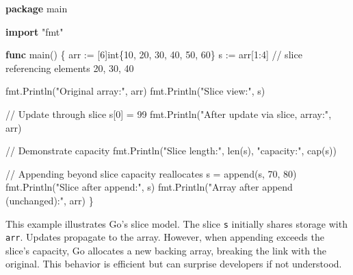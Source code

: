 \documentclass[
  letterpaper,
  DIV=11,
  numbers=noendperiod]{scrreprt}
\newenvironment{Shaded}{\begin{snugshade}}{\end{snugshade}}
\newcommand{\BuiltInTok}[1]{\textcolor[rgb]{0.00,0.23,0.31}{#1}}
\newcommand{\CommentTok}[1]{\textcolor[rgb]{0.37,0.37,0.37}{#1}}
\newcommand{\DataTypeTok}[1]{\textcolor[rgb]{0.68,0.00,0.00}{#1}}
\newcommand{\DecValTok}[1]{\textcolor[rgb]{0.68,0.00,0.00}{#1}}
\newcommand{\KeywordTok}[1]{\textcolor[rgb]{0.00,0.23,0.31}{\textbf{#1}}}
\newcommand{\NormalTok}[1]{\textcolor[rgb]{0.00,0.23,0.31}{#1}}
\newcommand{\OperatorTok}[1]{\textcolor[rgb]{0.37,0.37,0.37}{#1}}
\newcommand{\StringTok}[1]{\textcolor[rgb]{0.13,0.47,0.30}{#1}}
\begin{document}
\begin{Shaded}
\begin{Highlighting}[]
\KeywordTok{package}\NormalTok{ main}

\KeywordTok{import} \StringTok{"fmt"}

\KeywordTok{func}\NormalTok{ main}\OperatorTok{()} \OperatorTok{\{}
\NormalTok{    arr }\OperatorTok{:=} \OperatorTok{[}\DecValTok{6}\OperatorTok{]}\DataTypeTok{int}\OperatorTok{\{}\DecValTok{10}\OperatorTok{,} \DecValTok{20}\OperatorTok{,} \DecValTok{30}\OperatorTok{,} \DecValTok{40}\OperatorTok{,} \DecValTok{50}\OperatorTok{,} \DecValTok{60}\OperatorTok{\}}
\NormalTok{    s }\OperatorTok{:=}\NormalTok{ arr}\OperatorTok{[}\DecValTok{1}\OperatorTok{:}\DecValTok{4}\OperatorTok{]} \CommentTok{// slice referencing elements 20, 30, 40}

\NormalTok{    fmt}\OperatorTok{.}\NormalTok{Println}\OperatorTok{(}\StringTok{"Original array:"}\OperatorTok{,}\NormalTok{ arr}\OperatorTok{)}
\NormalTok{    fmt}\OperatorTok{.}\NormalTok{Println}\OperatorTok{(}\StringTok{"Slice view:"}\OperatorTok{,}\NormalTok{ s}\OperatorTok{)}

    \CommentTok{// Update through slice}
\NormalTok{    s}\OperatorTok{[}\DecValTok{0}\OperatorTok{]} \OperatorTok{=} \DecValTok{99}
\NormalTok{    fmt}\OperatorTok{.}\NormalTok{Println}\OperatorTok{(}\StringTok{"After update via slice, array:"}\OperatorTok{,}\NormalTok{ arr}\OperatorTok{)}

    \CommentTok{// Demonstrate capacity}
\NormalTok{    fmt}\OperatorTok{.}\NormalTok{Println}\OperatorTok{(}\StringTok{"Slice length:"}\OperatorTok{,} \BuiltInTok{len}\OperatorTok{(}\NormalTok{s}\OperatorTok{),} \StringTok{"capacity:"}\OperatorTok{,} \BuiltInTok{cap}\OperatorTok{(}\NormalTok{s}\OperatorTok{))}

    \CommentTok{// Appending beyond slice capacity reallocates}
\NormalTok{    s }\OperatorTok{=} \BuiltInTok{append}\OperatorTok{(}\NormalTok{s}\OperatorTok{,} \DecValTok{70}\OperatorTok{,} \DecValTok{80}\OperatorTok{)}
\NormalTok{    fmt}\OperatorTok{.}\NormalTok{Println}\OperatorTok{(}\StringTok{"Slice after append:"}\OperatorTok{,}\NormalTok{ s}\OperatorTok{)}
\NormalTok{    fmt}\OperatorTok{.}\NormalTok{Println}\OperatorTok{(}\StringTok{"Array after append (unchanged):"}\OperatorTok{,}\NormalTok{ arr}\OperatorTok{)}
\OperatorTok{\}}
\end{Highlighting}
\end{Shaded}

This example illustrates Go's slice model. The slice \texttt{s}
initially shares storage with \texttt{arr}. Updates propagate to the
array. However, when appending exceeds the slice's capacity, Go
allocates a new backing array, breaking the link with the original. This
behavior is efficient but can surprise developers if not understood.
\end{document}
